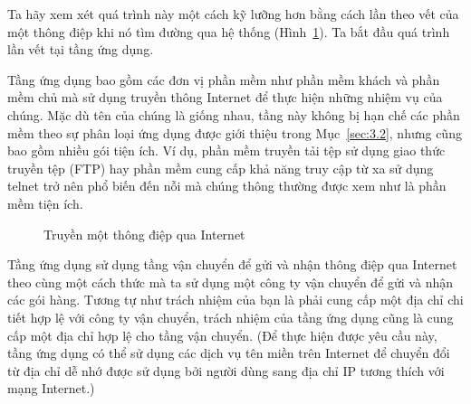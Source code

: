 Ta hãy xem xét quá trình này một cách kỹ lưỡng hơn bằng cách lần theo vết của một
thông điệp khi nó tìm đường qua hệ thống (Hình~\ref{fig:fig4.14}). Ta bắt đầu quá
trình lần vết tại tầng ứng dụng.


Tầng ứng dụng bao gồm các đơn vị phần mềm như phần mềm khách và phần mềm chủ mà sử dụng
truyền thông Internet để thực hiện những nhiệm vụ của chúng. Mặc dù tên của chúng là giống
nhau, tầng này không bị hạn chế các phần mềm theo sự phân loại ứng dụng được giới thiệu
trong Mục~\ref{sec:3.2}, nhưng cũng bao gồm nhiều gói tiện ích. Ví dụ, phần mềm truyền tải tệp sử
dụng giao thức truyền tệp (FTP) hay phần mềm cung cấp khả năng truy cập từ xa sử dụng
telnet trở nên phổ biến đến nỗi mà chúng thông thường được xem như là phần mềm tiện ích.


\begin{figure} 
  \centering {}
  \caption{Truyền một thông điệp qua Internet}
  \label{fig:fig4.14}
\end{figure}


Tầng ứng dụng sử dụng tầng vận chuyển để gửi và nhận thông điệp qua Internet theo cùng một
cách thức mà ta sử dụng một công ty vận chuyển để gửi và nhận các gói hàng. Tương tự
như trách nhiệm của bạn là phải cung cấp một địa chỉ chi tiết hợp lệ với công ty vận
chuyển, trách nhiệm của tầng ứng dụng cũng là cung cấp một địa chỉ hợp lệ cho tầng vận
chuyển. (Để thực hiện được yêu cầu này, tầng ứng dụng có thể sử dụng các dịch vụ tên miền
trên Internet để chuyển đổi từ địa chỉ dễ nhớ được sử dụng bởi người dùng sang địa chỉ IP
tương thích với mạng Internet.)

